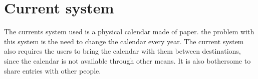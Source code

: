 \section{Current system}
The currents system used is a physical calendar made of paper. the problem with this system is the need to change the calendar every year. The current system also requires the users to bring the calendar with them between destinations, since the calendar is not available through other means. It is also bothersome to share entries with other people.